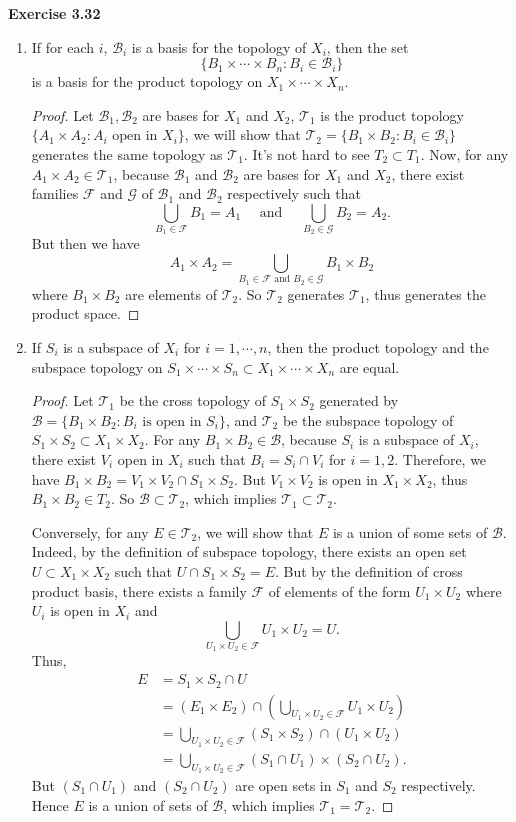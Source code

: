 \documentclass[12pt, a4paper]{article}
\theoremstyle{plain}
\newcommand{\B}{\mathscr{B}}
\newcommand{\F}{\mathcal{F}}
\newcommand{\T}{\mathcal{T}}
\newcommand{\G}{\mathcal{G}}
\newenvironment{exercise}[2][Exercise]
    { \begin{mdframed}[backgroundcolor=gray!20] \textbf{#1 #2} \\}
    {  \end{mdframed}}
\begin{document}
\begin{exercise}{3.32}
\begin{enumerate}[label=(\alph*)]
\item If for each $i$, $\B_i$ is a basis for the topology of $X_i$, then the set 
\[
\{B_1\times\cdots\times B_n:B_i\in \B_i\}
\]
is a basis for the product topology on $X_1\times\cdots\times X_n$.
	\begin{proof}
	Let $\B_1,\B_2$ are bases for $X_1$ and $X_2$, $\T_1$ is the product topology $\{A_1\times A_2:A_i \text{ open in } X_i\}$, we will show that $\T_2=\{B_1\times B_2:B_i\in \B_i\}$ generates the same topology as $\T_1$. It's not hard to see $T_2\subset T_1$. Now, for any $A_1\times A_2\in \T_1$, because $\B_1$ and $\B_2$ are bases for $X_1$ and $X_2$, there exist families $\F$ and $\G$ of $\B_1$ and $\B_2$ respectively such that 
	\[
	\bigcup_{B_1\in\F}B_1 = A_1 \quad\text{ and }\quad \bigcup_{B_2\in \G}B_2 = A_2.
	\]
	But then we have
	\[
	A_1\times A_2 = \bigcup_{B_1\in\F\text{ and }B_2\in\G}B_1\times B_2
	\]
	where $B_1\times B_2$ are elements of $\T_2$. So $\T_2$ generates $\T_1$, thus generates the product space.
	\end{proof}

\pagebreak
\item If $S_i$ is a subspace of $X_i$ for $i=1,\cdots,n$, then the product topology and the subspace topology on $S_1\times\cdots\times S_n\subset X_1\times\cdots\times X_n$ are equal.
	\begin{proof}
	Let $\T_1$ be the cross topology of $S_1\times S_2$ generated by $\B=\{B_1\times B_2:B_i\text{ is open in }S_i\}$, and $\T_2$ be the subspace topology of $S_1\times S_2\subset X_1\times X_2$. For any $B_1\times B_2\in\B$, because $S_i$ is a subspace of $X_i$, there exist $V_i$ open in $X_i$ such that $B_i=S_i\cap V_i$ for $i=1,2$. Therefore, we have $B_1\times B_2=V_1\times V_2\cap S_1\times S_2$. But $V_1\times V_2$ is open in $X_1\times X_2$, thus $B_1\times B_2\in T_2$. So $\B\subset \T_2$, which implies $\T_1\subset \T_2$.
	
	Conversely, for any $E\in \T_2$, we will show that $E$ is a union of some sets of $\B$. Indeed, by the definition of subspace topology, there exists an open set $U\subset X_1\times X_2$ such that $U\cap S_1\times S_2=E$. But by the definition of cross product basis, there exists a family $\F$ of elements of the form $U_1\times U_2$ where $U_i$ is open in $X_i$ and
	\[
	\bigcup_{U_1\times U_2\in \F}U_1\times U_2 = U.
	\]
	Thus,
	\begin{align*}
	E&=S_1\times S_2\cap U\\
	&=(E_1\times E_2)\cap \left(\bigcup_{U_1\times U_2\in \F}U_1\times U_2\right)\\
	&=\bigcup_{U_1\times U_2\in \F}(S_1\times S_2)\cap(U_1\times U_2)\\
	&=\bigcup_{U_1\times U_2\in \F}(S_1\cap U_1)\times (S_2\cap U_2).
	\end{align*}
	But $(S_1\cap U_1)$ and $(S_2\cap U_2)$ are open sets in $S_1$ and $S_2$ respectively. Hence $E$ is a union of sets of $\B$, which implies $\T_1=\T_2$.


\end{proof}
\end{enumerate}
\end{exercise}
\end{document}

